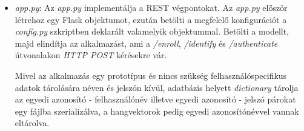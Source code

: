 \begin{itemize}
	\item \emph{app.py}: Az \emph{app.py} implementálja a REST végpontokat. Az \emph{app.py} először létrehoz egy Flask objektumot, ezután betölti a megfelelő konfigurációt a \emph{config.py} szkriptben deklarált valamelyik objektummal. Betölti a modellt, majd elindítja az alkalmazást, ami a \emph{/enroll}, \emph{/identify} és \emph{/authenticate} útvonalakon \emph{HTTP POST} kérésekre vár.
	
	Mivel az alkalmazás egy prototípus és nincs szükség felhasználóspecifikus adatok tárolására néven és jelszón kívül, adatbázis helyett \emph{dictionary} tárolja az egyedi azonosító - felhasználónév illetve egyedi azonosító - jelszó párokat egy fájlba szerializálva, a hangvektorok pedig egyedi azonosítónévvel vannak eltárolva.
	

\end{itemize}
